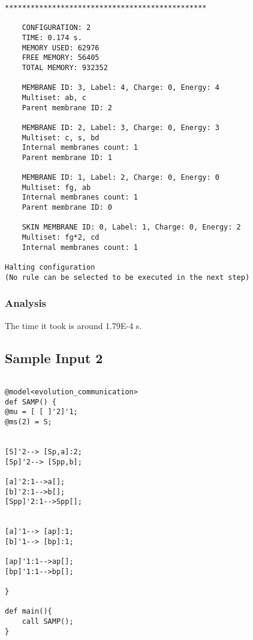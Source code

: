\documentclass{acm_proc_article-sp}
\begin{document}
\begin{lstlisting}
***********************************************

    CONFIGURATION: 2
    TIME: 0.174 s.
    MEMORY USED: 62976
    FREE MEMORY: 56405
    TOTAL MEMORY: 932352

    MEMBRANE ID: 3, Label: 4, Charge: 0, Energy: 4
    Multiset: ab, c
    Parent membrane ID: 2

    MEMBRANE ID: 2, Label: 3, Charge: 0, Energy: 3
    Multiset: c, s, bd
    Internal membranes count: 1
    Parent membrane ID: 1

    MEMBRANE ID: 1, Label: 2, Charge: 0, Energy: 0
    Multiset: fg, ab
    Internal membranes count: 1
    Parent membrane ID: 0

    SKIN MEMBRANE ID: 0, Label: 1, Charge: 0, Energy: 2
    Multiset: fg*2, cd
    Internal membranes count: 1

Halting configuration 
(No rule can be selected to be executed in the next step)
\end{lstlisting}


\subsubsection{Analysis}
The time it took is around 1.79E-4 s.\\
\subsection{Sample Input 2}
\begin{lstlisting}

@model<evolution_communication>
def SAMP() {
@mu = [ [ ]'2]'1;
@ms(2) = S;


[S]'2--> [Sp,a]:2;
[Sp]'2--> [Spp,b];

[a]'2:1-->a[];
[b]'2:1-->b[];
[Spp]'2:1-->Spp[];


[a]'1--> [ap]:1;
[b]'1--> [bp]:1;

[ap]'1:1-->ap[];
[bp]'1:1-->bp[];

}

def main(){
	call SAMP();
}
\end{lstlisting}
\end{document}
